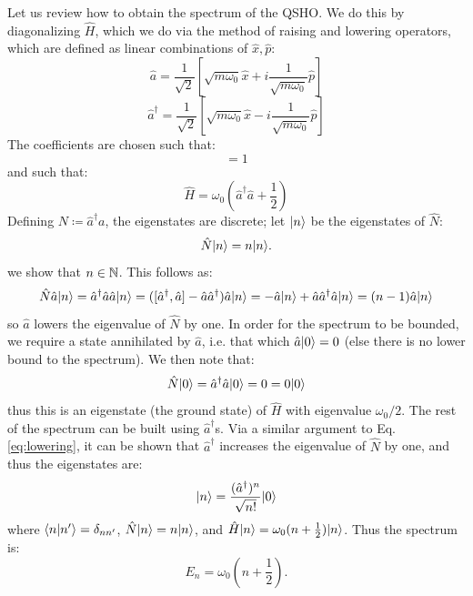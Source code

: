 Let us review how to obtain the spectrum of the QSHO. We do this by diagonalizing $\hat{H}$, which we do via the method of raising and lowering operators, which are defined as linear combinations of $\hat{x}, \hat{p}$:
\begin{equation}
    \hat{a} = \frac{1}{\sqrt{2}}\left[\sqrt{m\omega_0}\hat{x} + i\frac{1}{\sqrt{m\omega_0}}\hat{p}\right]
\end{equation}
\begin{equation}
    \hat{a}^\dagger = \frac{1}{\sqrt{2}}\left[\sqrt{m\omega_0}\hat{x} - i\frac{1}{\sqrt{m\omega_0}}\hat{p}\right]
\end{equation}
The coefficients are chosen such that:
\begin{equation}
    [\hat{a}, \hat{a}^\dagger] = 1
\end{equation}
and such that:
\begin{equation}
    \hat{H} = \omega_0(\hat{a}^\dagger \hat{a} + \frac{1}{2})
\end{equation}
Defining $N \coloneqq \hat{a}^\dagger a$, the eigenstates are discrete; let $\lvert n \rangle$ be the eigenstates of $\hat{N}$:
\begin{equation}
    \hat{N}\lvert n \rangle = n\lvert n \rangle.
\end{equation}
we show that $n \in \mathbb{N}$. This follows as:
\begin{equation}\label{eq:lowering}
    \hat{N}\hat{a}\lvert n \rangle = \hat{a}^\dagger \hat{a}\hat{a}\lvert n \rangle = ([\hat{a}^\dagger, \hat{a}] - \hat{a}\hat{a}^\dagger)\hat{a}\lvert n \rangle = -\hat{a}\lvert n \rangle + \hat{a}\hat{a}^\dagger \hat{a}\lvert n \rangle = (n-1)\hat{a}\lvert n \rangle
\end{equation}
so $\hat{a}$ lowers the eigenvalue of $\hat{N}$ by one. In order for the spectrum to be bounded, we require a state annihilated by $\hat{a}$, i.e. that which $\hat{a}\lvert 0 \rangle = 0$ (else there is no lower bound to the spectrum). We then note that:
\begin{equation}
    \hat{N}\lvert 0 \rangle = \hat{a}^\dagger\hat{a}\lvert 0 \rangle = 0 = 0\lvert 0 \rangle
\end{equation}
thus this is an eigenstate (the ground state) of $\hat{H}$ with eigenvalue $\omega_0/2$. The rest of the spectrum can be built using $\hat{a}^\dagger$s. Via a similar argument to Eq. \eqref{eq:lowering}, it can be shown that $\hat{a}^\dagger$ increases the eigenvalue of $\hat{N}$ by one, and thus the eigenstates are:
\begin{equation}
    \lvert n \rangle = \frac{(\hat{a}^\dagger)^n}{\sqrt{n!}}\lvert 0 \rangle
\end{equation}
where $\langle n \lvert n' \rangle = \delta_{nn'}$, $\hat{N}\lvert n \rangle = n\lvert n \rangle$, and $\hat{H}\lvert n \rangle = \omega_0(n + \frac{1}{2})\lvert n \rangle$. Thus the spectrum is:
\begin{equation}
    \boxed{E_n = \omega_0(n + \frac{1}{2})}.
\end{equation}

